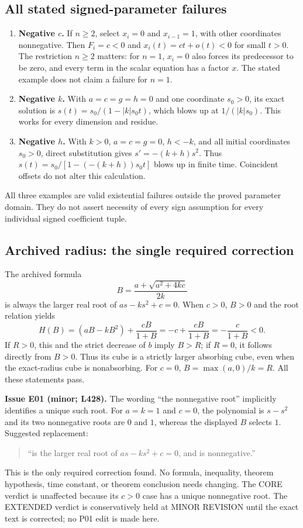 \documentclass[11pt]{article}
\newcommand{\lin}[1]{\textbf{L#1}}
\begin{document}
\subsection{All stated signed-parameter failures}
\begin{enumerate}
\item \textbf{Negative $c$.} If $n\geq2$, select $x_i=0$ and
$x_{i-1}=1$, with other coordinates nonnegative. Then $F_i=c<0$ and
$x_i(t)=ct+o(t)<0$ for small $t>0$. The restriction $n\geq2$ matters:
for $n=1$, $x_i=0$ also forces its predecessor to be zero, and every
term in the scalar equation has a factor $x$. The stated example does
not claim a failure for $n=1$.
\item \textbf{Negative $k$.} With $a=c=g=h=0$ and one coordinate
$s_0>0$, its exact solution is
$s(t)=s_0/(1-|k|s_0t)$, which blows up at $1/(|k|s_0)$.
This works for every dimension and residue.
\item \textbf{Negative $h$.} With $k>0$, $a=c=g=0$, $h<-k$,
and all initial coordinates $s_0>0$, direct substitution gives
$s'=-(k+h)s^2$. Thus
$s(t)=s_0/[1-(-(k+h))s_0t]$ blows up in finite time. Coincident
offsets do not alter this calculation.
\end{enumerate}
All three examples are valid existential failures outside the proved
parameter domain. They do not assert necessity of every sign assumption
for every individual signed coefficient tuple.

\subsection{Archived radius: the single required correction}
The archived formula
\[
 B=\frac{a+\sqrt{a^2+4kc}}{2k}
\]
is always the larger real root of $as-ks^2+c=0$. When $c>0$, $B>0$
and the root relation yields
\[
 H(B)=(aB-kB^2)+\frac{cB}{1+B}
       =-c+\frac{cB}{1+B}=-\frac{c}{1+B}<0.
\]
If $R>0$, this and the strict decrease of $b$ imply $B>R$; if $R=0$,
it follows directly from $B>0$. Thus its cube is a strictly larger
absorbing cube, even when the exact-radius cube is nonabsorbing.
For $c=0$, $B=\max(a,0)/k=R$. All these statements pass.

\textbf{Issue E01 (minor; \lin{428}).} The wording ``the nonnegative
root'' implicitly identifies a unique such root. For $a=k=1$ and
$c=0$, the polynomial is $s-s^2$ and its two nonnegative roots are
$0$ and $1$, whereas the displayed $B$ selects $1$. Suggested replacement:
\begin{quote}
``is the larger real root of $as-ks^2+c=0$, and is nonnegative.''
\end{quote}
This is the only required correction found. No formula, inequality,
theorem hypothesis, time constant, or theorem conclusion needs changing.
The CORE verdict is unaffected because its $c>0$ case has a unique
nonnegative root. The EXTENDED verdict is conservatively held at
MINOR REVISION until the exact text is corrected; no P01 edit is made here.
\end{document}
